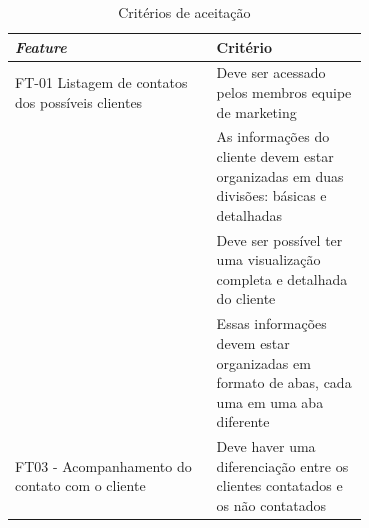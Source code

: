 \begin{table}[!h]
\centering
\caption{Critérios de aceitação}
\label{criterios}
  \begin{tabular}{p{0.40\linewidth}p{0.30\linewidth}}
  \hline
  \textit{Feature}  & Critério\\
  \hline
      FT-01 Listagem de contatos dos possíveis clientes & Deve ser acessado pelos membros equipe de marketing\\
      & As informações do cliente devem estar organizadas em duas divisões: básicas e detalhadas\\
      & Deve ser possível ter uma visualização completa e detalhada do cliente\\
      & Essas informações devem estar organizadas em formato de abas, cada uma em uma aba diferente\\
  \hline
      FT03 - Acompanhamento do contato com o cliente & Deve haver uma diferenciação entre os clientes contatados e os não contatados\\

  \hline
  \end{tabular}
\end{table}

